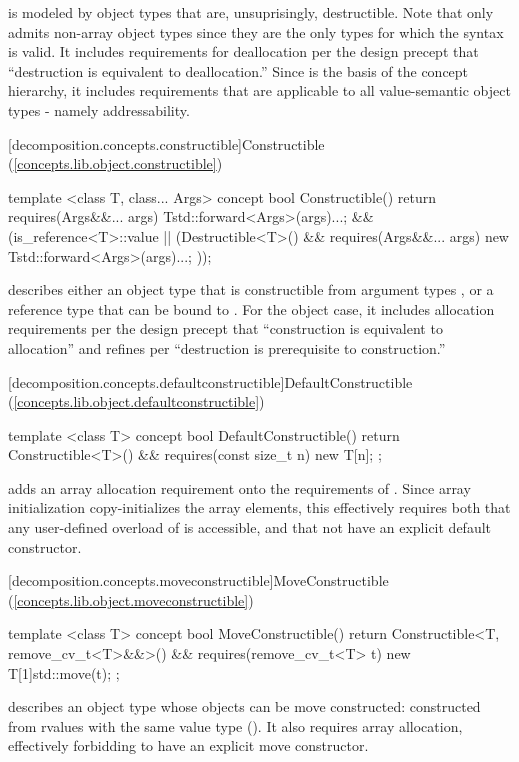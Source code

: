  is modeled by object types that are, unsuprisingly, destructible.  Note
that  only admits non-array object types since they are the only types for which
the syntax  is valid. It includes requirements for deallocation per the design
precept that ``destruction is equivalent to deallocation.'' Since  is the basis
of the concept hierarchy, it includes requirements that are applicable to all value-semantic
object types - namely addressability.

[decomposition.concepts.constructible]{Constructible (\ref{concepts.lib.object.constructible})}
\begin{codeblock}
template <class T, class... Args>
concept bool Constructible() {
  return requires(Args&&... args) {
    T{std::forward<Args>(args)...};
  } &&
  (is_reference<T>::value ||
    (Destructible<T>() && requires(Args&&... args) {
      new T{std::forward<Args>(args)...};
    }));
}
\end{codeblock}

 describes either an object type  that is constructible from argument types
, or a reference type  that can be bound to . For the object case,
it includes allocation requirements per the design precept that ``construction is equivalent to allocation''
and refines  per ``destruction is prerequisite to construction.''

[decomposition.concepts.defaultconstructible]{DefaultConstructible (\ref{concepts.lib.object.defaultconstructible})}
\begin{codeblock}
template <class T>
concept bool DefaultConstructible() {
  return Constructible<T>() &&
    requires(const size_t n) {
      new T[n]{};
    };
}
\end{codeblock}

 adds an array allocation requirement onto the requirements of
. Since array initialization copy-initializes the array elements,
this effectively requires both that any user-defined overload of  is
accessible, and that  not have an explicit default constructor.

[decomposition.concepts.moveconstructible]{MoveConstructible (\ref{concepts.lib.object.moveconstructible})}
\begin{codeblock}
template <class T>
concept bool MoveConstructible() {
  return Constructible<T, remove_cv_t<T>&&>() &&
    requires(remove_cv_t<T> t) {
      new T[1]{std::move(t)};
    };
}
\end{codeblock}
 describes an object type  whose objects can be move constructed:
constructed from rvalues with the same value type (). It also requires array
allocation, effectively forbidding  to have an explicit move constructor.

